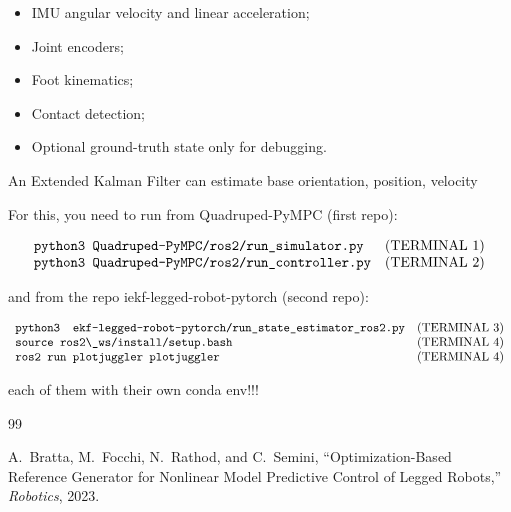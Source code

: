 \documentclass[11pt,a4paper]{article}
\begin{document}
\begin{itemize}
    \item IMU angular velocity and linear acceleration;
    \item Joint encoders;
    \item Foot kinematics;
    \item Contact detection;
    \item Optional ground-truth state only for debugging.
\end{itemize}

An Extended Kalman Filter can estimate base orientation, position, velocity

For this, you need to run from Quadruped-PyMPC (first repo):

\[
\begin{array}{ll}
\verb|python3 Quadruped-PyMPC/ros2/run_simulator.py| & \text{(TERMINAL 1)} \\
\verb|python3 Quadruped-PyMPC/ros2/run_controller.py|  & \text{(TERMINAL 2)}
\end{array}
\]



and from the repo iekf-legged-robot-pytorch (second repo):

\[
\begin{array}{ll}
	\verb|python3  ekf-legged-robot-pytorch/run_state_estimator_ros2.py| & \text{(TERMINAL 3)} \\
    \verb|source ros2\_ws/install/setup.bash|   & \text{(TERMINAL 4)} \\
    \verb|ros2 run plotjuggler plotjuggler| & \text{(TERMINAL 4)}
\end{array}
\]

each of them with their own conda env!!!


\begin{thebibliography}{99}
	
	A.~Bratta, M.~Focchi, N.~Rathod, and C.~Semini,
	``Optimization-Based Reference Generator for Nonlinear Model Predictive Control of Legged Robots,''
	\emph{Robotics}, 2023.
	
\end{thebibliography}
\end{document}
